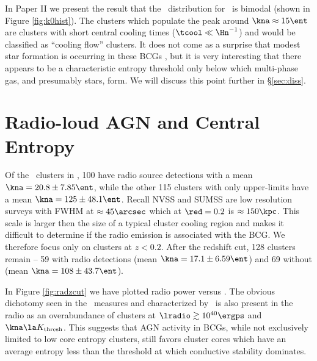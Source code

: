 \documentclass{emulateapj}
\begin{document}
In Paper II we present the result that the \kna\ distribution for
\accept\ is bimodal (shown in Figure \ref{fig:k0hist}). The clusters
which populate the peak around $\kna \approx 15 \ent$ are clusters
with short central cooling times ($\tcool \ll \Hn^{-1}$) and would be
classified as ``cooling flow'' clusters. It does not come as a
surprise that modest star formation is occurring in these BCGs
\citep{hu85}, but it is very interesting that there appears to be a
characteristic entropy threshold only below which multi-phase gas, and
presumably stars, form. We will discuss this point further in
\S\ref{sec:diss}.

\section{Radio-loud AGN and Central Entropy}
\label{sec:agn}

Of the \clnum\ clusters in \accept, 100 have radio source detections
with a mean $\kna = 20.8 \pm 7.85 \ent$, while the other 115 clusters
with only upper-limits have a mean $\kna = 125 \pm 48.1 \ent$. Recall
NVSS and SUMSS are low resolution surveys with FWHM at $\approx
45\arcsec$ which at $\red = 0.2$ is $\approx 150\kpc$. This scale is
larger then the size of a typical cluster cooling region and makes it
difficult to determine if the radio emission is associated with the
BCG. We therefore focus only on clusters at $z < 0.2$. After the
redshift cut, 128 clusters remain -- 59 with radio detections (mean
$\kna = 17.1 \pm 6.59 \ent$) and 69 without (mean $\kna = 108 \pm 43.7
\ent$).

In Figure \ref{fig:radzcut} we have plotted radio power versus \kna.
The obvious dichotomy seen in the \halpha\ measures and characterized
by \kthr\, is also present in the radio as an overabundance of
clusters at $\lradio \gtrsim 10^{40} \ergps$ and $\kna \la \kthr$.
This suggests that AGN activity in BCGs, while not exclusively limited
to low core entropy clusters, still favors cluster cores which have an
average entropy less than the threshold at which conductive stability
dominates.
\end{document}

